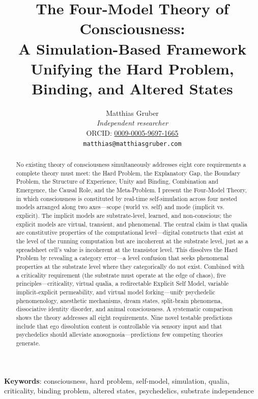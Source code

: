 \documentclass[12pt]{article}
\title{The Four-Model Theory of Consciousness:\\A Simulation-Based Framework Unifying the Hard Problem, Binding, and Altered States}
\author{Matthias Gruber\\
\textit{Independent researcher}\\
ORCID: \href{https://orcid.org/0009-0005-9697-1665}{0009-0005-9697-1665}\\
\texttt{matthias@matthiasgruber.com}}
\date{}
\begin{document}
\maketitle

\begin{abstract}\singlespacing
No existing theory of consciousness simultaneously addresses eight core requirements a complete theory must meet: the Hard Problem, the Explanatory Gap, the Boundary Problem, the Structure of Experience, Unity and Binding, Combination and Emergence, the Causal Role, and the Meta-Problem. I present the Four-Model Theory, in which consciousness is constituted by real-time self-simulation across four nested models arranged along two axes---\hspace{0pt}scope (world vs. self) and mode (implicit vs. explicit). The implicit models are substrate-level, learned, and non-conscious; the explicit models are virtual, transient, and phenomenal. The central claim is that qualia are constitutive properties of the computational level---\hspace{0pt}digital constructs that exist at the level of the running computation but are incoherent at the substrate level, just as a spreadsheet cell's value is incoherent at the transistor level. This dissolves the Hard Problem by revealing a category error---\hspace{0pt}a level confusion that seeks phenomenal properties at the substrate level where they categorically do not exist. Combined with a criticality requirement (the substrate must operate at the edge of chaos), five principles---\hspace{0pt}criticality, virtual qualia, a redirectable Explicit Self Model, variable implicit-explicit permeability, and virtual model forking---\hspace{0pt}unify psychedelic phenomenology, anesthetic mechanisms, dream states, split-brain phenomena, dissociative identity disorder, and animal consciousness. A systematic comparison shows the theory addresses all eight requirements. Nine novel testable predictions include that ego dissolution content is controllable via sensory input and that psychedelics should alleviate anosognosia---\hspace{0pt}predictions few competing theories generate.
\end{abstract}

\noindent\textbf{Keywords}: consciousness, hard problem, self-model, simulation, qualia, criticality, binding problem, altered states, psychedelics, substrate independence
\end{document}
